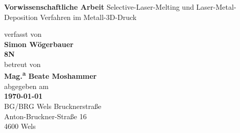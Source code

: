 \documentclass[main.tex]{subfiles}
\begin{document}
        \begin{titlepage}
	\thispagestyle{fancy}
    \renewcommand{\headrulewidth}{0pt}
    \renewcommand{\footrulewidth}{0pt}
    \vspace*{.4cm}
    \cfoot{} %
    \begin{center}
        \vspace*{.7cm}
        \Huge
	\textbf{Vorwissenschaftliche Arbeit}
	\huge
	\vspace*{.1cm}
        Selective-Laser-Melting und Laser-Metal-Deposition Verfahren im Metall-3D-Druck
        \vspace*{1.5cm}

	\large
	verfasst von\\
	\LARGE
        \textbf{Simon Wögerbauer}\\
	\textbf{8N}\\
	\vspace*{.3cm}
	\large
	betreut von\\
	\LARGE
	\textbf{Mag.\textsuperscript{a} Beate Moshammer}\\
	\large
	\vspace*{.5cm}
	abgegeben am\\
	\LARGE
	\textbf{\today} \\
        \vfill{}
	\Large
	BG/BRG Wels Brucknerstraße\\
	Anton-Bruckner-Straße 16\\
	4600 Wels\\
    \end{center}
\end{titlepage}
\begin{center}
\end{center}
\end{document}
